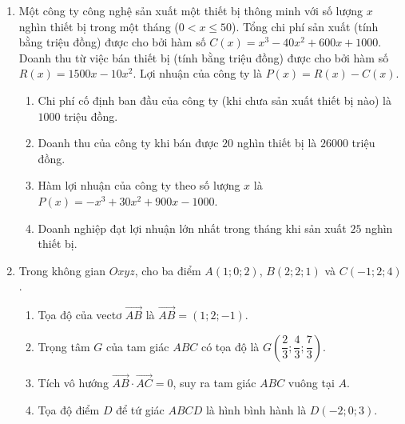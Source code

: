 \documentclass[12pt,a4paper]{article}
\begin{document}
\newpage
\begin{enumerate}[start=2]
\item Một công ty công nghệ sản xuất một thiết bị thông minh với số lượng $x$ nghìn thiết bị trong một tháng ($0 < x \le 50$). Tổng chi phí sản xuất (tính bằng triệu đồng) được cho bởi hàm số $C(x)=x^3-40x^2+600x+1000$. Doanh thu từ việc bán thiết bị (tính bằng triệu đồng) được cho bởi hàm số $R(x)=1500x-10x^2$. Lợi nhuận của công ty là $P(x)=R(x)-C(x)$.
\begin{enumerate}
\item Chi phí cố định ban đầu của công ty (khi chưa sản xuất thiết bị nào) là $1000$ triệu đồng.
\item Doanh thu của công ty khi bán được $20$ nghìn thiết bị là $26000$ triệu đồng.
\item Hàm lợi nhuận của công ty theo số lượng $x$ là $P(x)=-x^3+30x^2+900x-1000$.
\item Doanh nghiệp đạt lợi nhuận lớn nhất trong tháng khi sản xuất $25$ nghìn thiết bị.
\end{enumerate}

\item Trong không gian $Oxyz$, cho ba điểm $A(1;0;2)$, $B(2;2;1)$ và $C(-1;2;4)$.
\begin{enumerate}
\item Tọa độ của vectơ $\vec{AB}$ là $\vec{AB}=(1;2;-1)$.
\item Trọng tâm $G$ của tam giác $ABC$ có tọa độ là $G\left(\dfrac{2}{3};\dfrac{4}{3};\dfrac{7}{3}\right)$.
\item Tích vô hướng $\vec{AB}\cdot\vec{AC}=0$, suy ra tam giác $ABC$ vuông tại $A$.
\item Tọa độ điểm $D$ để tứ giác $ABCD$ là hình bình hành là $D(-2;0;3)$.
\end{enumerate}


\end{enumerate}
\end{document}
